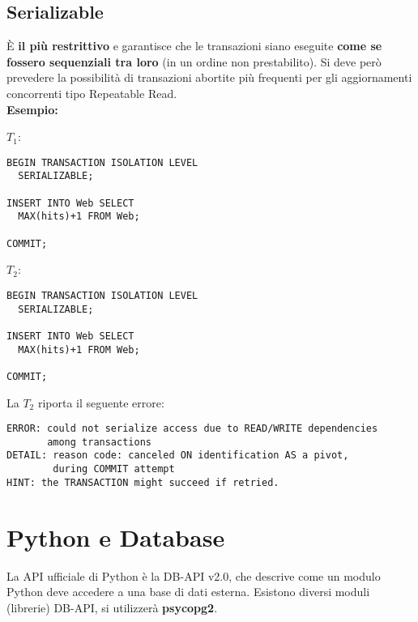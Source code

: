 \documentclass[a4paper, 10pt, titlepage]{article}
\begin{document}
	\subsection{Serializable}
		È \textbf{il più restrittivo} e garantisce che le transazioni siano eseguite \textbf{come se fossero sequenziali tra loro} (in un ordine non prestabilito). Si deve però prevedere la possibilità di transazioni abortite più frequenti per gli aggiornamenti concorrenti tipo Repeatable Read.\\
		\textbf{Esempio:}
		\begin{multicols}{2}
		\noindent
		$ T_1 $:
		\begin{lstlisting}
BEGIN TRANSACTION ISOLATION LEVEL
  SERIALIZABLE;
  
INSERT INTO Web SELECT
  MAX(hits)+1 FROM Web;

COMMIT;
		\end{lstlisting}
		\columnbreak
		$ T_2 $:
		\begin{lstlisting}
BEGIN TRANSACTION ISOLATION LEVEL
  SERIALIZABLE;

INSERT INTO Web SELECT
  MAX(hits)+1 FROM Web;

COMMIT;
		\end{lstlisting}
		\end{multicols}
		
		La $ T_2 $ riporta il seguente errore:
		\begin{lstlisting}
ERROR: could not serialize access due to READ/WRITE dependencies 
       among transactions
DETAIL: reason code: canceled ON identification AS a pivot, 
        during COMMIT attempt
HINT: the TRANSACTION might succeed if retried.
		\end{lstlisting}
	
\section{Python e Database}
	La API ufficiale di Python è la DB-API v2.0, che descrive come un modulo Python deve accedere a una base di dati esterna. Esistono diversi moduli (librerie) DB-API, si utilizzerà \textbf{psycopg2}.
\end{document}
